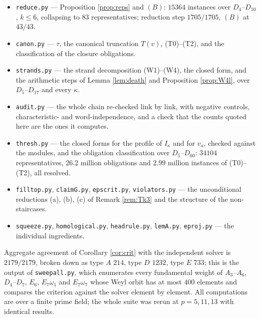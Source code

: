 \documentclass[11pt,reqno]{amsart}
\theoremstyle{plain}
\theoremstyle{definition}
\newcommand{\om}{\omega}
\newcommand{\ka}{\kappa}
\begin{document}
\begin{itemize}
hypotheses over $D_4$--$D_7$, the four exceptions all at $\ka=4$.
\item \texttt{reduce.py} --- Proposition \ref{prop:reps} and $(B)$: $15364$
instances over $D_4$--$D_{10}$, $k\le6$, collapsing to $83$ representatives;
reduction step $1705/1705$, $(B)$ at $43/43$.
\item \texttt{canon.py} --- $\tau$, the canonical truncation $T(v)$,
(T0)--(T2), and the classification of the closure obligations.
\item \texttt{strands.py} --- the strand decomposition (W1)--(W4), the closed
form, and the arithmetic steps of Lemma \ref{lem:death} and Proposition
\ref{prop:W4l}, over $D_5$--$D_{17}$ and every $\ka$.
\item \texttt{audit.py} --- the whole chain re-checked link by link, with
negative controls, characteristic- and word-independence, and a check that the
counts quoted here are the ones it computes.
\item \texttt{thresh.py} --- the closed forms for the profile of $I_\ka$ and
for $v_a$, checked against the modules, and the obligation classification over
$D_5$--$D_{60}$: $34104$ representatives, $26.2$ million obligations and
$2.99$ million instances of (T0)--(T2), all resolved.
\item \texttt{filltop.py}, \texttt{claimG.py}, \texttt{epscrit.py},
\texttt{violators.py} --- the unconditional reductions (a), (b), (c) of Remark
\ref{rem:Tk3} and the structure of the non-staircases.
\item \texttt{squeeze.py}, \texttt{homological.py}, \texttt{headrule.py},
\texttt{lemA.py}, \texttt{eproj.py} --- the individual ingredients.
\end{itemize}

Aggregate agreement of Corollary \ref{cor:crit} with the independent solver is
$2179/2179$, broken down as type $A$ $214$, type $D$ $1232$, type $E$ $733$;
this is the output of \texttt{sweepall.py}, which enumerates every fundamental
weight of $A_3$--$A_6$, $D_4$--$D_7$, $E_6$, $E_7\om_1$ and $E_7\om_7$ whose
Weyl orbit has at most $400$ elements and compares the criterion against the
solver element by element.  All computations are over a finite prime field; the
whole suite was rerun at $p=5,11,13$ with identical results.
\end{document}
